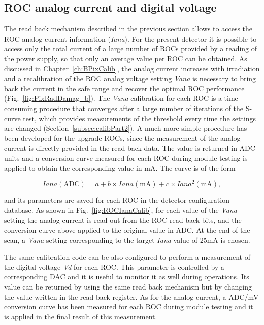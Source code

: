 \subsection{ROC analog current and digital voltage}

The read back mechanism described in the previous section allows to access the ROC analog current information (\textit{Iana}).
For the present detector it is possible to access only the total current of a large number of ROCs provided by a reading of the power supply, so that only an average value per ROC can be obtained.
As discussed in Chapter~\ref{ch:BPixCalib}, the analog current increases with irradiation and a recalibration of the ROC analog voltage setting \textit{Vana}
is necessary to bring back the current in the safe range and recover the optimal ROC performance (Fig.~\ref{fig:PixRadDamag_b}).
The \textit{Vana} calibration for each ROC is a time consuming procedure that converges after a large number of iterations of the S-curve test,
which provides measurements of the threshold every time the settings are changed (Section~\ref{subsec:calibPart2}).
A much more simple procedure has been developed for the upgrade ROCs, since the measurement of the analog current is directly provided in the read back data.
The value is returned in ADC units and a conversion curve measured for each ROC during module testing is applied to obtain the corresponding value in mA.
The curve is of the form

\begin{equation}
Iana (\mathrm{ADC}) = a + b \times Iana (\mathrm{mA}) + c \times Iana^2 (\mathrm{mA}),
\end{equation}

and its parameters are saved for each ROC in the detector configuration database.
As shown in Fig.~\ref{fig:ROCIanaCalib}, for each value of the \textit{Vana} setting the analog current is read out from the ROC read back bits,
and the conversion curve above applied to the original value in ADC.
At the end of the scan, a \textit{Vana} setting corresponding to the target \textit{Iana} value of 25\unit{mA} is chosen.

The same calibration code can be also configured to perform a measurement of the digital voltage \textit{Vd} for each ROC.
This parameter is controlled by a corresponding DAC and it is useful to monitor it as well during operations.
Its value can be returned by using the same read back mechanism but by changing the value written in the read back register.
As for the analog current, a ADC/mV conversion curve has been measured for each ROC during module testing
and it is applied in the final result of this measurement.

